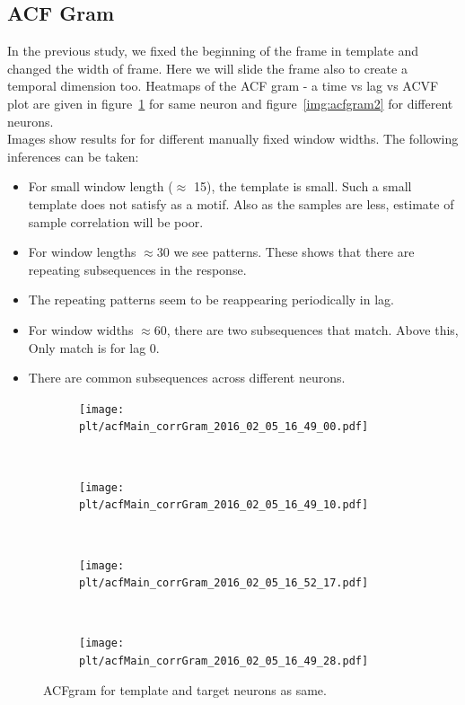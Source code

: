 \documentclass[11pt]{article}
\newcommand{\plt}{../../plots}
\begin{document}
\subsection{ACF Gram} %
\label{sub:acf_gram}
In the previous study, we fixed the beginning of the frame in template and changed the width of frame. Here we will slide the frame also to create a temporal dimension too. Heatmaps of the ACF gram - a time vs lag vs ACVF plot are given in figure~\ref{img:acfgram1} for same neuron and figure~\ref{img:acfgram2} for different neurons.\\
Images show results for for different manually fixed window widths. The following inferences can be taken:
\begin{itemize}
    \item For small window length ($\approx$ 15), the template is small. Such a small template does not satisfy as a motif. Also as the samples are less, estimate of sample correlation will be poor.
    \item For window lengths $\approx 30$ we see patterns. These shows that there are repeating subsequences in the response.
    \item The repeating patterns seem to be reappearing periodically in lag.
    \item For window widths $\approx 60$, there are two subsequences that match. Above this, Only match is for lag 0.
    \item There are common subsequences across different neurons.
\end{itemize}
\begin{figure}
    \centering
    \begin{subfigure}[b]{.48\textwidth}
        \centering
        \texttt{[image: \\plt/acfMain\_corrGram\_2016\_02\_05\_16\_49\_00.pdf]}
    \end{subfigure}
    ~
    \begin{subfigure}[b]{.48\textwidth}
        \centering
        \texttt{[image: \\plt/acfMain\_corrGram\_2016\_02\_05\_16\_49\_10.pdf]}
    \end{subfigure}
    \\
    \begin{subfigure}[b]{.48\textwidth}
        \centering
        \texttt{[image: \\plt/acfMain\_corrGram\_2016\_02\_05\_16\_52\_17.pdf]}
    \end{subfigure}
    ~
    \begin{subfigure}[b]{.48\textwidth}
        \centering
        \texttt{[image: \\plt/acfMain\_corrGram\_2016\_02\_05\_16\_49\_28.pdf]}
    \end{subfigure}
    \caption{ACFgram for template and target neurons as same.}
    \label{img:acfgram1}
\end{figure}
\end{document}
